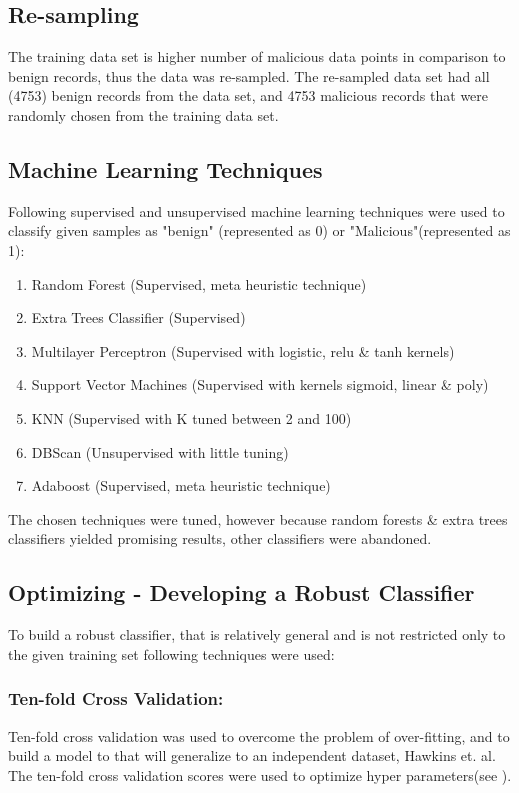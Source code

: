 \documentclass{llncs}
\begin{document}
\subsection{Re-sampling}
The training data set is higher number of malicious data points in comparison to benign records, thus the data was re-sampled. The re-sampled data set had all (4753) benign records from the data set, and 4753 malicious records that were randomly chosen from  the training data set.

\subsection{Machine Learning Techniques}
Following supervised and unsupervised machine learning techniques were used to classify given samples as "benign" (represented as 0) or "Malicious"(represented as 1):
\begin{enumerate}
   \item Random Forest (Supervised, meta heuristic technique)
   \item Extra Trees Classifier (Supervised)
   \item Multilayer Perceptron (Supervised with logistic, relu \& tanh kernels)
   \item Support Vector Machines (Supervised with kernels sigmoid, linear \& poly)
   \item KNN (Supervised with K tuned between 2 and 100)
   \item DBScan (Unsupervised with little tuning)
   \item Adaboost (Supervised, meta heuristic technique)
 \end{enumerate}
 The chosen techniques were tuned, however because random forests \& extra trees classifiers yielded promising results, other classifiers were abandoned.
\subsection{Optimizing - Developing a Robust Classifier}
To build a robust classifier, that is relatively general and is not restricted only to the given training set following techniques were used:

\subsubsection{Ten-fold Cross Validation:} Ten-fold cross validation was used to overcome the problem of over-fitting, and to build a model to that will generalize to an independent dataset, Hawkins et. al. The ten-fold cross validation scores were used to optimize hyper parameters(see \cite{hawkins:eke}). 
\end{document}
